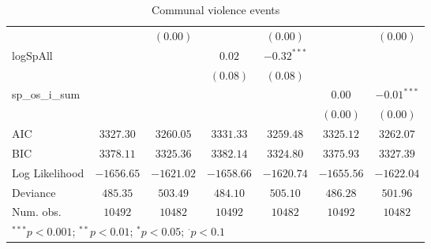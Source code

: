 \begin{sidewaystable}
\begin{center}
{\begin{tabular}{l c c c c c c}
                &               & $(0.00)$      &                 & $(0.00)$       &               & $(0.00)$      \\
logSpAll        &               &               & $0.02$          & $-0.32^{***}$  &               &               \\
                &               &               & $(0.08)$        & $(0.08)$       &               &               \\
sp\_os\_i\_sum  &               &               &                 &                & $0.00$        & $-0.01^{***}$ \\
                &               &               &                 &                & $(0.00)$      & $(0.00)$      \\
\hline
AIC             & $3327.30$     & $3260.05$     & $3331.33$       & $3259.48$      & $3325.12$     & $3262.07$     \\
BIC             & $3378.11$     & $3325.36$     & $3382.14$       & $3324.80$      & $3375.93$     & $3327.39$     \\
Log Likelihood  & $-1656.65$    & $-1621.02$    & $-1658.66$      & $-1620.74$     & $-1655.56$    & $-1622.04$    \\
Deviance        & $485.35$      & $503.49$      & $484.10$        & $505.10$       & $486.28$      & $501.96$      \\
Num. obs.       & $10492$       & $10482$       & $10492$         & $10482$        & $10492$       & $10482$       \\
\hline
\multicolumn{7}{l}{\scriptsize{$^{***}p<0.001$; $^{**}p<0.01$; $^{*}p<0.05$; $^{\cdot}p<0.1$}}
\end{tabular}
}
\caption{Communal violence events}
\label{org3}
\end{center}
\end{sidewaystable}
